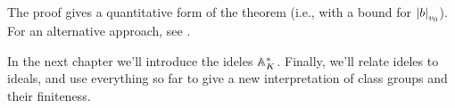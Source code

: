 \begin{remark}
The proof gives a quantitative form of the theorem (i.e.,
with a bound for $\abs{b}_{v_0}$).  For an alternative approach,
see \cite{mahler:inequalities}.
\end{remark}

In the next chapter we'll introduce the ideles $\AA_K^*$.  Finally,
we'll relate ideles to ideals, and use everything so far to give a new
interpretation of class groups and their finiteness.

